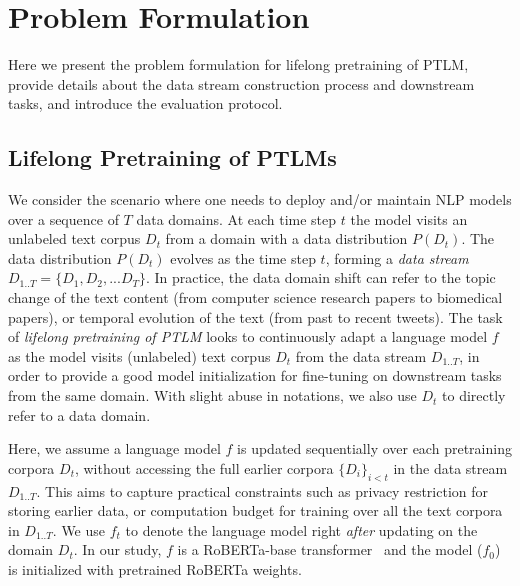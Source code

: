 \section{Problem Formulation}
\label{sec:setup}Here we present the problem formulation for lifelong pretraining of PTLM, provide details about the data stream construction process and downstream tasks, and introduce the evaluation protocol.




\subsection{Lifelong Pretraining of PTLMs}
We consider the scenario where one needs to deploy and/or maintain NLP models over a sequence of $T$ data domains. At each time step $t$ the model visits an unlabeled text corpus $D_t$ from a domain with a data distribution $P(D_t)$. The data distribution $P(D_t)$ evolves as the time step $t$, forming a \textit{data stream} $D_{1..T}=\{D_1, D_2,...D_T\}$. In practice, the data domain shift can refer to the topic change of the text content (from computer science research papers to biomedical papers), or temporal evolution of the text (from past to recent tweets).
The task of \textit{lifelong pretraining of PTLM} looks to continuously adapt a language model $f$ as the model visits (unlabeled) text corpus $D_t$ from the data stream $D_{1..T}$, in order to provide a good model initialization for fine-tuning on downstream tasks from the same domain. With slight abuse in notations, we also use $D_t$ to directly refer to a data domain. 

Here, we assume a language model $f$ is updated sequentially over each pretraining corpora $D_t$, without accessing the full earlier corpora $\{D_i\}_{i<t}$ in the data stream $D_{1..T}$. This aims to capture practical constraints such as privacy restriction for storing earlier data, or computation budget for training over all the text corpora in $D_{1..T}$. 
We use $f_t$ to denote the language model right \textit{after} updating on the domain $D_t$. 
In our study, $f$ is a RoBERTa-base transformer~\cite{Liu2019RoBERTaAR} and the model ($f_0$) is initialized with pretrained RoBERTa weights.

